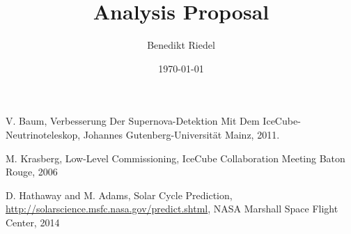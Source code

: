 \documentclass[10pt]{article}
\title{Analysis Proposal}
\author{Benedikt Riedel}
\date{\today}
\begin{document}
\maketitle







% 
\begin{thebibliography}{3}

 V. Baum, Verbesserung Der Supernova-Detektion Mit Dem IceCube-Neutrinoteleskop, Johannes Gutenberg-Universit\"{a}t Mainz, 2011.

 M. Krasberg, Low-Level Commissioning, IceCube Collaboration Meeting Baton Rouge, 2006

 D. Hathaway and M. Adams, Solar Cycle Prediction, \url{http://solarscience.msfc.nasa.gov/predict.shtml}, NASA Marshall Space Flight Center, 2014

\end{thebibliography}
\end{document}
